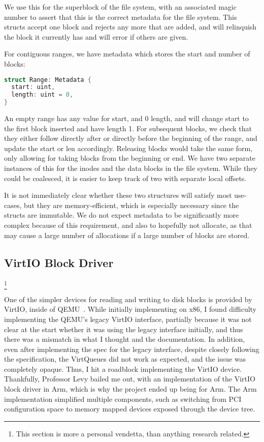 \documentclass[letterpaper,twocolumn,10pt]{article}
\begin{document}
We use this for the superblock of the file system, with an associated magic number to assert
that this is the correct metadata for the file system. This structs accept one block and rejects
any more that are added, and will relinquish the block it currently has and will error if others
are given.

For contiguous ranges, we have metadata which stores the start and number of blocks:
\begin{lstlisting}[language=rust, basicstyle=\small]
struct Range: Metadata {
  start: uint,
  length: uint = 0,
}
\end{lstlisting}

An empty range has any value for start, and 0 length, and will change start to the first block
inserted and have length 1. For subsequent blocks, we check that they either follow directly
after or directly before the beginning of the range, and update the start or len accordingly.
Releasing blocks would take the same form, only allowing for taking blocks from the beginning or
end. We have two separate instances of this for the inodes and the data blocks in the file system.
While they could be coalesced, it is easier to keep track of two with separate local offsets.

It is not immediately clear whether these two structures will satisfy most use-cases, but they
are memory-efficient, which is especially necessary since the structs are immutable. We do not
expect metadata to be significantly more complex because of this requirement, and also to
hopefully not allocate, as that may cause a large number of allocations if a large number of
blocks are stored.

\subsection{VirtIO Block Driver}\footnote{This section is more a personal vendetta, than
anything research related.}

One of the simpler devices for reading and writing to disk blocks is provided by VirtIO, inside
of QEMU~\cite{qemu}. While initially implementing on x86, I found difficulty implementing the
QEMU's legacy VirtIO interface, partially because it was not clear at the start whether it was
using the legacy interface initially, and thus there was a mismatch in what I thought and the
documentation. In addition, even after implementing the spec for the legacy interface, despite
closely following the specification, the VirtQueues did not work as expected, and the issue was
completely opaque. Thus, I hit a roadblock implementing the VirtIO device. Thankfully, Professor
Levy bailed me out, with an implementation of the VirtIO block driver in Arm, which is why the
project ended up being for Arm. The Arm implementation simplified multiple components, such as
switching from PCI configuration space to memory mapped devices exposed through the device tree.
\end{document}
